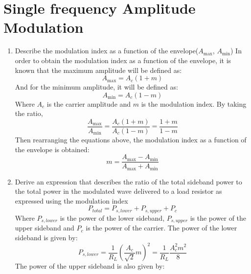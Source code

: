 \section{Single frequency Amplitude Modulation}
\begin{enumerate}
    \item Describe the modulation index as a function of the envelope($A_{\text{max}}$, $A_{\text{min}}$)
          In order to obtain the modulation index as a function of the envelope, it is known that the maximum amplitude will be defined as:
          \begin{equation}
              A_{\text{max}} = A_c(1+m)
          \end{equation}
          And for the minimum amplitude, it will be defined as:
          \begin{equation}
              A_{\text{min}} = A_c(1-m)
          \end{equation}
          Where $A_c$ is the carrier amplitude and $m$ is the modulation index. By taking the ratio,
          \begin{equation}
              \frac{A_{\text{max}}}{A_{\text{min}}} = \frac{A_c(1+m)}{A_c(1-m)} = \frac{1+m}{1-m}
          \end{equation}
          Then rearranging the equations above, the modulation index as a function of the envelope is obtained:
          \begin{equation}
              m = \frac{A_{\text{max}}-A_{\text{min}}}{A_{\text{max}}+A_{\text{min}}}
          \end{equation}
    \item Derive an expression that describes the ratio of the total sideband power to the total power in the modulated wave delivered to a load resistor as expressed using the modulation index
          \begin{equation}
              P_{total} = P_{s,lower} + P_{s,upper} + P_c
          \end{equation}
          Where $P_{s,lower}$ is the power of the lower sideband, $P_{s,upper}$ is the power of the upper sideband and $P_c$ is the power of the carrier. The power of the lower sideband is given by:
          \begin{equation}
              P_{s,lower} = \frac{1}{R_L}(\frac{A_c}{\sqrt{2}}m)^2 = \frac{1}{R_L} \frac{A_{c}^2m^2}{8}
          \end{equation}
          The power of the upper sideband is also given by:
          \begin{equation}

\end{equation}
\end{enumerate}
